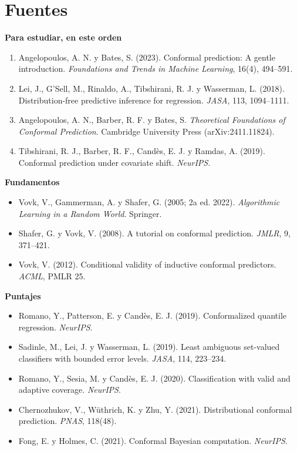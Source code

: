 \documentclass[11pt]{article}
\theoremstyle{plain}
\theoremstyle{definition}
\theoremstyle{remark}
\begin{document}
\section*{Fuentes}
\small
\textbf{Para estudiar, en este orden}
\begin{enumerate}
\item Angelopoulos, A. N. y Bates, S. (2023). Conformal prediction: A gentle introduction.
\emph{Foundations and Trends in Machine Learning}, 16(4), 494--591.
\item Lei, J., G'Sell, M., Rinaldo, A., Tibshirani, R. J. y Wasserman, L. (2018). Distribution-free
predictive inference for regression. \emph{JASA}, 113, 1094--1111.
\item Angelopoulos, A. N., Barber, R. F. y Bates, S. \emph{Theoretical Foundations of Conformal
Prediction}. Cambridge University Press (arXiv:2411.11824).
\item Tibshirani, R. J., Barber, R. F., Candès, E. J. y Ramdas, A. (2019). Conformal prediction under
covariate shift. \emph{NeurIPS}.
\end{enumerate}
\textbf{Fundamentos}
\begin{itemize}
\item Vovk, V., Gammerman, A. y Shafer, G. (2005; 2a ed. 2022). \emph{Algorithmic Learning in a Random
World}. Springer.
\item Shafer, G. y Vovk, V. (2008). A tutorial on conformal prediction. \emph{JMLR}, 9, 371--421.
\item Vovk, V. (2012). Conditional validity of inductive conformal predictors. \emph{ACML}, PMLR 25.
\end{itemize}
\textbf{Puntajes}
\begin{itemize}
\item Romano, Y., Patterson, E. y Candès, E. J. (2019). Conformalized quantile regression.
\emph{NeurIPS}.
\item Sadinle, M., Lei, J. y Wasserman, L. (2019). Least ambiguous set-valued classifiers with bounded
error levels. \emph{JASA}, 114, 223--234.
\item Romano, Y., Sesia, M. y Candès, E. J. (2020). Classification with valid and adaptive coverage.
\emph{NeurIPS}.
\item Chernozhukov, V., Wüthrich, K. y Zhu, Y. (2021). Distributional conformal prediction.
\emph{PNAS}, 118(48).
\item Fong, E. y Holmes, C. (2021). Conformal Bayesian computation. \emph{NeurIPS}.
\end{itemize}
\end{document}
